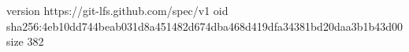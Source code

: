 version https://git-lfs.github.com/spec/v1
oid sha256:4eb10dd744beab031d8a451482d674dba468d419dfa34381bd20daa3b1b43d00
size 382
